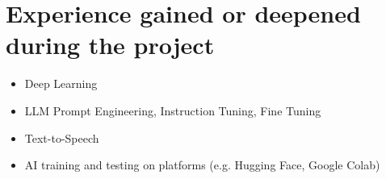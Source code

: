 \section{Experience gained or deepened during the project}
\begin{itemize}
  \item Deep Learning
  \item LLM Prompt Engineering, Instruction Tuning, Fine Tuning
  \item Text-to-Speech
  \item AI training and testing on platforms (e.g. Hugging Face, Google Colab)
\end{itemize}
